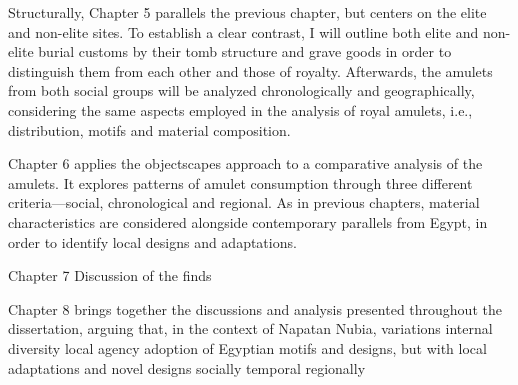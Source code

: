 Structurally, Chapter 5 parallels the previous chapter, but centers on the elite and non-elite sites. To establish a clear contrast, I will outline both elite and non-elite burial customs by their tomb structure and grave goods in order to distinguish them from each other and those of royalty. Afterwards, the amulets from both social groups will be analyzed chronologically and geographically, considering the same aspects employed in the analysis of royal amulets, i.e., distribution, motifs and material composition.


Chapter 6 applies the objectscapes approach to a comparative analysis of the amulets. It explores patterns of amulet consumption through three different criteria—social, chronological and regional. As in previous chapters, material characteristics are considered alongside contemporary parallels from Egypt, in order to identify local designs and adaptations.


Chapter 7 Discussion of the finds


Chapter 8 brings together the discussions and analysis presented throughout the dissertation, arguing that, in the context of Napatan Nubia, 
variations  
internal diversity  
local agency  
adoption of Egyptian motifs and designs, but with local adaptations and novel designs  socially  temporal regionally